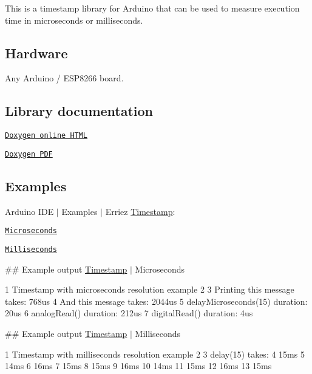 \href{https://travis-ci.org/Erriez/ErriezTimestamp}{\tt }

This is a timestamp library for Arduino that can be used to measure execution time in microseconds or milliseconds.



\subsection*{Hardware}

Any Arduino / E\+S\+P8266 board.

\subsection*{Library documentation}


\begin{DoxyItemize}
\item \href{https://Erriez.github.io/ErriezTimestamp}{\tt Doxygen online H\+T\+ML}
\item \href{https://github.com/Erriez/ErriezTimestamp/raw/gh-pages/latex/ErriezTimestamp.pdf}{\tt Doxygen P\+DF}
\end{DoxyItemize}

\subsection*{Examples}

Arduino I\+DE $\vert$ Examples $\vert$ Erriez \hyperlink{class_timestamp}{Timestamp}\+:


\begin{DoxyItemize}
\item \href{https://github.com/Erriez/ErriezTimestamp/blob/master/examples/Microseconds/Microseconds.ino}{\tt Microseconds}
\item \href{https://github.com/Erriez/ErriezTimestamp/blob/master/examples/Milliseconds/Milliseconds.ino}{\tt Milliseconds}
\end{DoxyItemize}

\#\# Example output \hyperlink{class_timestamp}{Timestamp} $\vert$ Microseconds 
\begin{DoxyCode}
1 Timestamp with microseconds resolution example
2 
3 Printing this message takes: 768us
4 And this message takes: 2044us
5 delayMicroseconds(15) duration: 20us
6 analogRead() duration: 212us
7 digitalRead() duration: 4us
\end{DoxyCode}


\#\# Example output \hyperlink{class_timestamp}{Timestamp} $\vert$ Milliseconds 
\begin{DoxyCode}
1 Timestamp with milliseconds resolution example
2 
3 delay(15) takes:
4 15ms
5 14ms
6 16ms
7 15ms
8 15ms
9 16ms
10 14ms
11 15ms
12 16ms
13 15ms
\end{DoxyCode}


